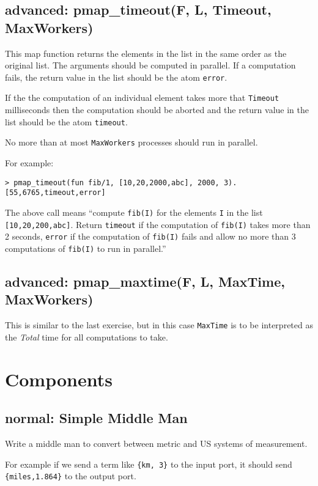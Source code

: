 \documentclass[12pt]{hitec}
\begin{document}
\subsection{advanced: pmap\_timeout(F, L, Timeout, MaxWorkers)}

This map function returns the elements in the list in the same order
as the original list. The arguments should be computed in parallel. If
a computation fails, the return value in the list should be the atom
\verb+error+.

If the the computation of an individual element takes more that
\verb+Timeout+ milliseconds then the computation should be aborted and
the return value in the list should be the atom \verb+timeout+.

No more than at most \verb+MaxWorkers+ processes should run in parallel.

For example:

\begin{Verbatim}
> pmap_timeout(fun fib/1, [10,20,2000,abc], 2000, 3).
[55,6765,timeout,error]
\end{Verbatim}

The above call means ``compute \verb+fib(I)+ for the elements \verb+I+
in the list \verb+[10,20,200,abc]+. Return \verb+timeout+ if the
computation of \verb+fib(I)+ takes more than 2 seconds, \verb+error+
if the computation of \verb+fib(I)+ fails and allow no more than 3
computations of \verb+fib(I)+ to run in parallel.''

\subsection{advanced: pmap\_maxtime(F, L, MaxTime, MaxWorkers)}

This is similar to the last exercise, but in this case \verb+MaxTime+ is to
be interpreted as the {\sl Total} time for all computations to take.

\section{Components}

\subsection{normal: Simple Middle Man}

Write a middle man to convert between metric and US systems of
measurement.

For example if we send a term like \verb+{km, 3}+ to the 
input port, it should send \verb+{miles,1.864}+ to the  output port.
\end{document}
